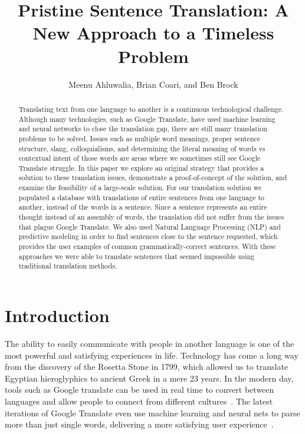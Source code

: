 \documentclass[runningheads]{llncs}
\title{Pristine Sentence Translation: A New Approach to a Timeless Problem}
\author{
	Meenu Ahluwalia, Brian Coari, and Ben Brock
}
\institute{$^1$Master of Science in Data Science \\ Southern Methodist University \\ Dallas, Texas USA \\
	\email{\{mahluwalia, bcoari, bbrock\}@smu.edu}}
\begin{document}
	
	\maketitle
	
	\begin{abstract}
		Translating text from one language to another is a continuous technological challenge. Although many technologies, such as Google Translate, have used machine learning and neural networks to close the translation gap, there are still many translation problems to be solved. Issues such as multiple word meanings, proper sentence structure, slang, colloquialisms, and determining the literal meaning of words vs contextual intent of those words are areas where we sometimes still see Google Translate struggle. In this paper we explore an original strategy that provides a solution to these translation issues, demonstrate a proof-of-concept of the solution, and examine the feasibility of a large-scale solution. For our translation solution we populated a database with translations of entire sentences from one language to another, instead of the words in a sentence. Since a sentence represents an entire thought instead of an assembly of words, the translation did not suffer from the issues that plague Google Translate. We also used Natural Language Processing (NLP) and predictive modeling in order to find sentences close to the sentence requested, which provides the user examples of common grammatically-correct sentences. With these approaches we were able to translate sentences that seemed impossible using traditional translation methods.
		
	\end{abstract}
	
	
	\section{Introduction}
	
	The ability to easily communicate with people in another language is one of the most powerful and satisfying experiences in life. Technology has come a long way from the discovery of the Rosetta Stone in 1799, which allowed us to translate Egyptian hieroglyphics to ancient Greek in a mere 23 years. In the modern day, tools such as Google translate can be used in real time to convert between languages and allow people to connect from different cultures~\cite{ref_url6}. The latest iterations of Google Translate even use machine learning and neural nets to parse more than just  single words, delivering a more satisfying user experience~\cite{ref_url7}.
	
\end{document}
